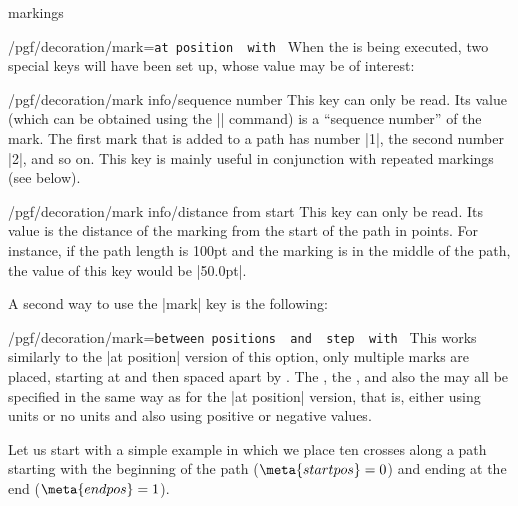 \begin{decoration}{markings}
\begin{key}{/pgf/decoration/mark=\texttt{at position }\texttt{ with }}
        When the  is being executed, two special keys will have been
        set up, whose value may be of interest:
        \begin{key}{/pgf/decoration/mark info/sequence number}
            This key can only be read. Its value (which can be obtained using
            the |\pgfkeysvalueof| command) is a ``sequence number'' of the
            mark. The first mark that is added to a path has number |1|, the
            second number |2|, and so on. This key is mainly useful in
            conjunction with repeated markings (see below).
        \end{key}
        \begin{key}{/pgf/decoration/mark info/distance from start}
            This key can only be read. Its value is the distance of the marking
            from the start of the path in points. For instance, if the path
            length is 100pt and the marking is in the middle of the path, the
            value of this key would be |50.0pt|.
        \end{key}
    \end{key}

    A second way to use the |mark| key is the following:
    \begin{key}{/pgf/decoration/mark=\texttt{between positions }\texttt{ and }\texttt{ step }\texttt{ with }}
        This works similarly to the |at position| version of this option, only
        multiple marks are placed, starting at  and then spaced
        apart by . The , the , and
        also the  may all be specified in the same way as for
        the |at position| version, that is, either using units or no units and
        also using positive or negative values.

        Let us start with a simple example in which we place ten crosses along
        a path starting with the beginning of the path ($\meta{start pos} = 0$)
        and ending at the end ($\meta{end pos} = 1$).
\begin{codeexample}[preamble={\usetikzlibrary{decorations.markings}}]
\end{codeexample}


\end{key}
\end{decoration}
